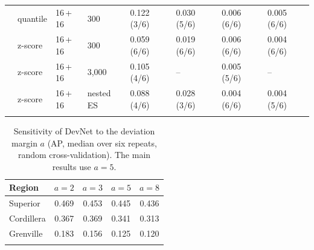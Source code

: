 \documentclass[pdflatex,sn-apa]{sn-jnl}
\begin{document}
\begin{appendices}
\begin{table}[!h]
\begin{tabular*}{\textwidth}{@{\extracolsep\fill}llllllll}
 & quantile & 16\,+\,16 & 300 & 0.122 (3/6) & 0.030 (5/6) & 0.006 (6/6) & 0.005 (6/6) \\
 & z-score & 16\,+\,16 & 300 & 0.059 (6/6) & 0.019 (6/6) & 0.006 (6/6) & 0.004 (6/6) \\
 & z-score & 16\,+\,16 & 3,000 & 0.105 (4/6) & -- & 0.005 (5/6) & -- \\
 & z-score & 16\,+\,16 & nested ES & 0.088 (4/6) & 0.028 (3/6) & 0.004 (6/6) & 0.004 (5/6) \\
\botrule
\end{tabular*}
\end{table}

\begin{table}[!h]
\caption{Sensitivity of DevNet to the deviation margin $a$ (AP, median over six repeats, random cross-validation). The main results use $a = 5$.}\label{tab:margin}
\footnotesize
\begin{tabular*}{0.7\textwidth}{@{\extracolsep\fill}lcccc}
\toprule
Region & $a = 2$ & $a = 3$ & $a = 5$ & $a = 8$ \\
\midrule
Superior & 0.469 & 0.453 & 0.445 & 0.436 \\
Cordillera & 0.367 & 0.369 & 0.341 & 0.313 \\
Grenville & 0.183 & 0.156 & 0.125 & 0.120 \\
\botrule
\end{tabular*}
\end{table}

\end{appendices}

\clearpage


\end{document}
